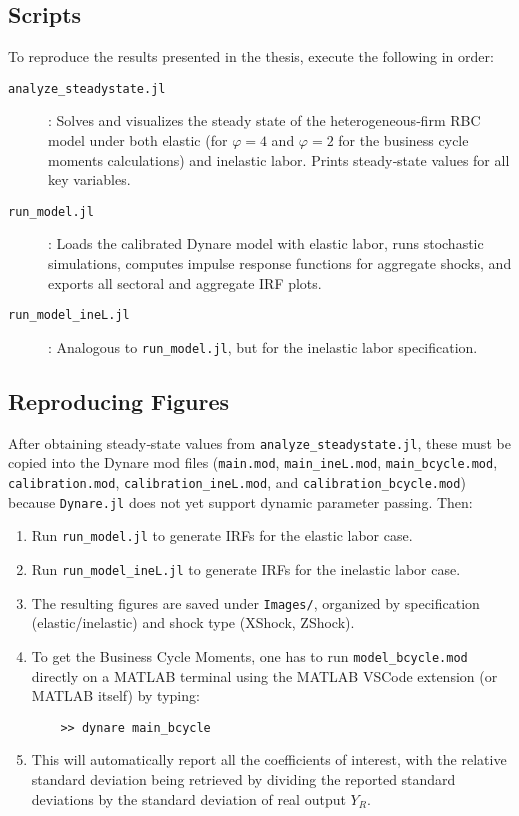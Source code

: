 \documentclass[a4paper,12pt]{article} %
\numberwithin{equation}{section} %
\numberwithin{figure}{section}
\numberwithin{table}{section}
\begin{document}
\begin{refsection}
\begin{appendices}
\subsection{Scripts}

To reproduce the results presented in the thesis, execute the following in order:

\begin{description}
  \item[\texttt{analyze\_steadystate.jl}]: 
    Solves and visualizes the steady state of the heterogeneous‐firm RBC model under both elastic 
    (for $\varphi = 4$ and $\varphi = 2$ for the business cycle moments calculations) and inelastic labor. Prints steady‐state values for all key variables.
  \item[\texttt{run\_model.jl}]: 
    Loads the calibrated Dynare model with elastic labor, runs stochastic simulations, computes impulse response functions for aggregate shocks, and exports all sectoral and aggregate IRF plots.
  \item[\texttt{run\_model\_ineL.jl}]: 
    Analogous to \texttt{run\_model.jl}, but for the inelastic labor specification.
\end{description}

\subsection{Reproducing Figures}

After obtaining steady‐state values from \texttt{analyze\_steadystate.jl}, 
these must be copied into the Dynare mod files (\texttt{main.mod}, \texttt{main\_ineL.mod}, 
\texttt{main\_bcycle.mod}, \texttt{calibration.mod}, \texttt{calibration\_ineL.mod}, and \texttt{calibration\_bcycle.mod}) 
because \texttt{Dynare.jl} does not yet support dynamic parameter passing. Then:

\begin{enumerate}
  \item Run \texttt{run\_model.jl} to generate IRFs for the elastic labor case.
  \item Run \texttt{run\_model\_ineL.jl} to generate IRFs for the inelastic labor case.
  \item The resulting figures are saved under \texttt{Images/}, organized by specification 
  (elastic/inelastic) and shock type (XShock, ZShock).
  \item To get the Business Cycle Moments, one has to run \texttt{model\_bcycle.mod} directly on a MATLAB terminal
  using the MATLAB VSCode extension (or MATLAB itself) by typing:
    \begin{verbatim}
    >> dynare main_bcycle
    \end{verbatim}
  \item This will automatically report all the coefficients of interest, with the relative standard deviation being retrieved
  by dividing the reported standard deviations by the standard deviation of real output $Y_R$.
\end{enumerate}



\end{appendices}
\end{refsection}
\end{document}

